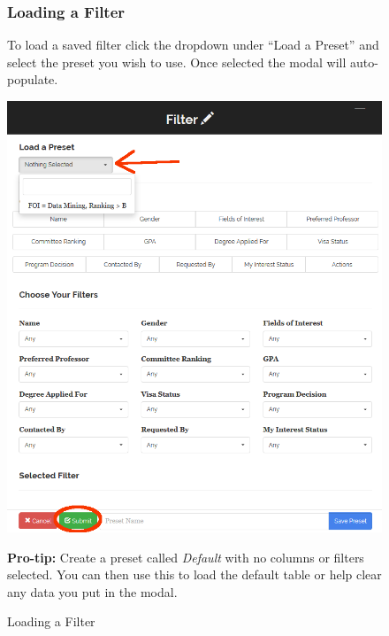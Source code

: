 \documentclass[fontsize=12pt,paper=letter,twoside]{scrartcl}
\begin{document}
\clearpage
\begin{figure}[!htb]
\subsubsection{Loading a Filter}
To load a saved filter click the dropdown under ``Load a Preset'' and select the preset you wish to use. Once selected the modal will auto-populate.
\begin{center}
\includegraphics[width=.99\textwidth]{images/prof/load_filter.png}
\end{center}
\caption{Loading a Filter}
\textbf{Pro-tip:} Create a preset called \emph{Default} with no columns or filters selected. You can then use this to load the default table or help clear any data you put in the modal.
\label{fig:prof/save_filter}
\end{figure}

\clearpage
\end{document}
